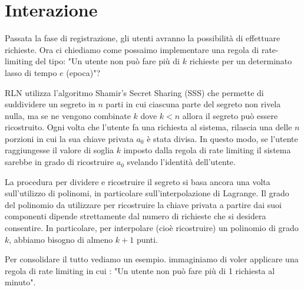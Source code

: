 \section{Interazione}
Passata la fase di registrazione, gli utenti avranno la possibilità di effettuare richieste. Ora ci chiediamo come possaimo implementare una regola di rate-limiting del tipo: "Un utente non può fare più di $k$ richieste per un determinato lasso di tempo $e$ (epoca)"?

RLN utilizza l'algoritmo Shamir's Secret Sharing (SSS) che permette di suddividere un segreto in $n$ parti in cui ciascuna parte del segreto non rivela nulla, ma se ne vengono combinate $k$ dove $k < n$ allora il segreto può essere ricostruito. Ogni volta che l'utente fa una richiesta al sistema, rilascia una delle $n$ porzioni in cui la sua chiave privata $a_0$ è stata divisa. In questo modo, se l'utente raggiungesse il valore di soglia $k$ imposto dalla regola di rate limiting il sistema sarebbe in grado di ricostruire $a_0$ svelando l'identità dell'utente.

La procedura per dividere e ricostruire il segreto si basa ancora una volta sull'utilizzo di polinomi, in particolare sull'interpolazione di Lagrange. Il grado del polinomio da utilizzare per ricostruire la chiave privata a partire dai suoi componenti dipende strettamente dal numero di richieste che si desidera consentire. In particolare, per interpolare (cioè ricostruire) un polinomio di grado $k$, abbiamo bisogno di almeno $k+1$ punti.

Per consolidare il tutto vediamo un esempio. immaginiamo di voler applicare una regola di rate limiting in cui :
"Un utente non può fare più di 1 richiesta al minuto". 

